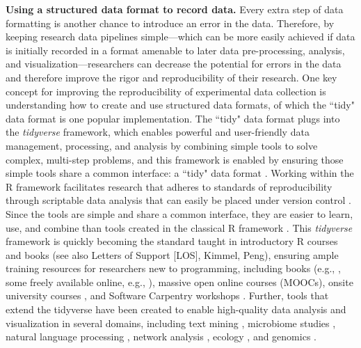 \documentclass[pdftex,english,11pt,parskip=half]{scrartcl}
\begin{document}
\textbf{Using a structured data format to record data.} Every extra step of data formatting is another chance to introduce an error in the data. Therefore, by keeping research data pipelines simple---which can be more easily achieved if data is initially recorded in a format amenable to later data pre-processing, analysis, and visualization---researchers can decrease the potential for errors in the data and therefore improve the rigor and reproducibility of their research. One key concept for improving the reproducibility of experimental data collection is understanding how to create and use structured data formats, of which the ``tidy" data format is one popular implementation. The ``tidy" data format plugs into the \textit{tidyverse} framework, which enables powerful and user-friendly data management, processing, and analysis by combining simple tools to solve complex, multi-step problems, and this framework is enabled by ensuring those simple tools share a common interface: a ``tidy" data format \cite{ross2017declutter, silge2016tidytext, wickham2016ggplot2, wickham2016r}. Working within the R framework facilitates research that adheres to standards of reproducibility through scriptable data analysis that can easily be placed under version control \cite{bryan2017excuse}. Since the tools are simple and share a common interface, they are easier to learn, use, and combine than tools created in the classical R framework \cite{ross2017declutter, lowndes2017our, reviewer2017review, mcnamara2016state}. This \textit{tidyverse} framework is quickly becoming the standard taught in introductory R courses and books \cite{hicks2017guide, baumer2015data, kaplan2017teaching, stander2017enthusing, reviewer2017review, mcnamara2016state} (see also Letters of Support [LOS], Kimmel, Peng), ensuring ample training resources for researchers new to programming, including books (e.g., \cite{baumer2017modern, lifesciencesR}, some freely available online, e.g., \cite{wickham2016r}), massive open online courses (MOOCs), onsite university courses \cite{baumer2015data, kaplan2017teaching, stander2017enthusing}, and Software Carpentry workshops \cite{wilson2014software, pawlik2017developing}. Further, tools that extend the tidyverse have been created to enable high-quality data analysis and visualization in several domains, including text mining \cite{silge2017text}, microbiome studies \cite{mcmurdie2013phyloseq}, natural language processing \cite{RJ-2017-035}, network analysis \cite{RJ-2017-023}, ecology \cite{hsieh2016inext}, and genomics \cite{yin2012ggbio}.
\end{document}
